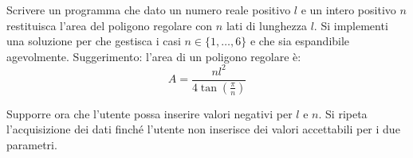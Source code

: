 \begin{Exercise}[label={ex:aree}]
		\Question Scrivere un programma che dato un numero reale positivo $l$ e un intero positivo $n$ restituisca l'area del poligono regolare con $n$ lati di lunghezza $l$. Si implementi una soluzione per che gestisca i casi $n \in \{ 1, \ldots, 6 \}$ e che sia espandibile agevolmente.
		Suggerimento: l'area di un poligono regolare \`e:
		\begin{equation}
			A = \frac{nl^2}{4\tan(\frac{\pi}{n})}
		\end{equation}
		
		\Question Supporre ora che l'utente possa inserire valori negativi per $l$ e $n$. Si ripeta l'acquisizione dei dati finché l'utente non inserisce dei valori accettabili per i due parametri.
\end{Exercise}

\begin{Answer}[ref={ex:aree}]
  \Question 

  \Question 
\end{Answer}

